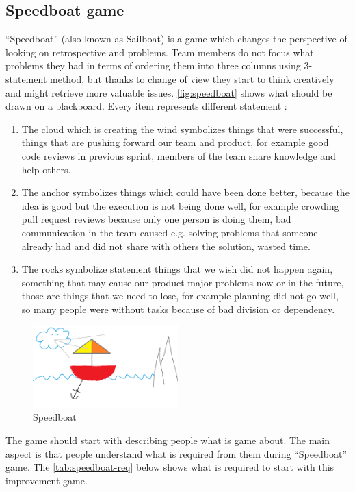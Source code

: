 \subsection{Speedboat game}
\label{subch:speedboatGame}
“Speedboat” (also known as Sailboat) is a game which changes the perspective of looking on retrospective and problems. Team members do not focus what problems they had in terms of ordering them into three columns using 3-statement method, but thanks to change of view they start to think creatively and might retrieve more valuable issues. \autoref{fig:speedboat} shows what should be drawn on a blackboard. Every item represents different statement \cite{SpeedboatBibliography}:
\begin{enumerate}
    \item The cloud which is creating the wind symbolizes things that were successful, things that are pushing forward our team and product, for example good code reviews in previous sprint, members of the team share knowledge and help others.
    \item The anchor symbolizes things which could have been done better, because the idea is good but the execution is not being done well, for example crowding pull request reviews because only one person is doing them, bad communication in the team caused e.g. solving problems that someone already had and did not share with others the solution, wasted time.
    \item The rocks symbolize statement things that we wish did not happen again, something that may cause our product major problems now or in the future, those are things that we need to lose, for example planning did not go well, so many people were without tasks because of bad division or dependency.
\end{enumerate}

\begin{figure}[h]
\caption{Speedboat}
\label{fig:speedboat}
\centering
\includegraphics[width=0.5\textwidth]{img/speedboat}
\end{figure}

The game should start with describing people what is game about. The main aspect is that people understand what is required from them during “Speedboat” game. The \autoref{tab:speedboat-req} below shows what is required to start with this improvement game.


